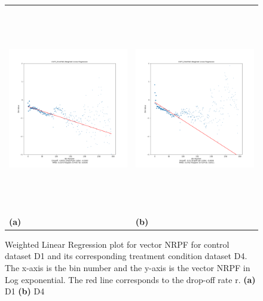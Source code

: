 \documentclass[a4,center,fleqn]{NAR}
\begin{document}
\begin{figure} [ht]
\centering
\begin{tabular}{ll}
\includegraphics[width=9cm,height=9cm]{D1FP_D1mRNA.Log.WLR.png} & \includegraphics[width=9cm,height=9cm]{D4FP_D4mRNA.Log.WLR.png} \\
\textbf{(a)}   & \textbf{(b)}     \\[0.1pt]
\end{tabular}
\caption{Weighted Linear Regression plot for vector NRPF for control dataset D1 and its corresponding treatment condition dataset D4. The x-axis is the bin number and the y-axis is the vector NRPF in Log exponential. The red line corresponds to the drop-off rate r.
\textbf{(a)} D1 
\textbf{(b)} D4
}
\label{fig1}
\end{figure}
\end{document}
